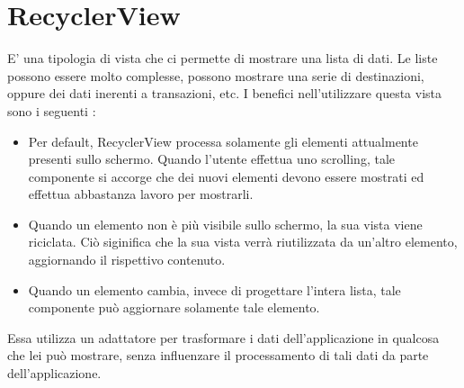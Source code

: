 \documentclass[12pt]{report}
\begin{document}
\section{RecyclerView}
E' una tipologia di vista che ci permette di mostrare una lista di dati. Le liste possono essere molto complesse, possono mostrare una serie di destinazioni, oppure dei dati inerenti a transazioni, etc. I benefici nell'utilizzare questa vista sono i seguenti :
\begin{itemize}
\item Per default, RecyclerView processa solamente gli elementi attualmente presenti sullo schermo. Quando l'utente effettua uno scrolling, tale componente si accorge che dei nuovi elementi devono essere mostrati ed effettua abbastanza lavoro per mostrarli.
\item Quando un elemento non è più visibile sullo schermo, la sua vista viene riciclata. Ciò siginifica che la sua vista verrà riutilizzata da un'altro elemento, aggiornando il rispettivo contenuto.
\item Quando un elemento cambia, invece di progettare l'intera lista, tale componente può aggiornare solamente tale elemento.
\end{itemize}
Essa utilizza un adattatore per trasformare i dati dell'applicazione in qualcosa che lei può mostrare, senza influenzare il processamento di tali dati da parte dell'applicazione.
\end{document}
